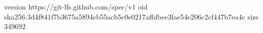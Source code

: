 version https://git-lfs.github.com/spec/v1
oid sha256:3d4f841f7b3675a5894eb55acb5c0e0217affdbee3fae54e206c2cf447b7ea4c
size 349692
